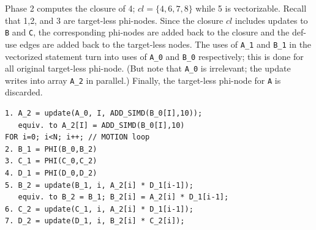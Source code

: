 \documentclass[sigconf, screen, natbib=false, dvipsnames, table]{acmart}
\theoremstyle{definition}
\begin{document}

Phase 2 computes the closure of 4; $cl = \{4,6,7, 8\}$ 
while 5 is vectorizable. Recall that 1,2, and 3 are target-less phi-nodes. Since the closure $cl$ includes updates to \texttt{B} and \texttt{C},
the corresponding phi-nodes are added back to the closure and the def-use edges are added back to the target-less nodes. The uses of \texttt{A\_1} and \texttt{B\_1} in the vectorized statement
turn into uses of \texttt{A\_0} and \texttt{B\_0} respectively; this is done for all original target-less phi-node. (But note that \texttt{A\_0} is irrelevant; the update writes into array \texttt{A\_2} in parallel.)
Finally, the target-less phi-node for \texttt{A} is discarded. 

{\small
\begin{verbatim}
1. A_2 = update(A_0, I, ADD_SIMD(B_0[I],10));
   equiv. to A_2[I] = ADD_SIMD(B_0[I],10)
FOR i=0; i<N; i++; // MOTION loop
2. B_1 = PHI(B_0,B_2)
3. C_1 = PHI(C_0,C_2)
4. D_1 = PHI(D_0,D_2)
5. B_2 = update(B_1, i, A_2[i] * D_1[i-1]);
   equiv. to B_2 = B_1; B_2[i] = A_2[i] * D_1[i-1];
6. C_2 = update(C_1, i, A_2[i] * D_1[i-1]);
7. D_2 = update(D_1, i, B_2[i] * C_2[i]);
\end{verbatim}
}
\end{document}
